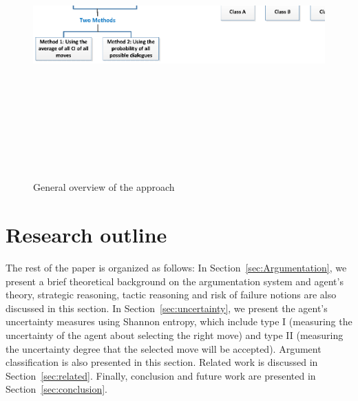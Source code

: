 \begin{figure}[t]
                \begin{center}
                \includegraphics[width=15cm, height=11cm]{Figures/Approach1.eps}
                \end{center}
                \caption{General overview of the approach}\label{fig1.0}
                \label{Stack}
                \end{figure}


\section{Research outline}\label{sec:outline}
The rest of the paper is organized as follows: In Section~\ref{sec:Argumentation}, we present a  brief theoretical background on the argumentation system
and agent's theory, strategic reasoning, tactic reasoning and risk of failure notions are also discussed in this section. In Section~\ref{sec:uncertainty},
we present the agent's uncertainty measures using Shannon entropy, which include type I (measuring the uncertainty of the agent about selecting the right move)
and type II (measuring the uncertainty degree that the selected move will be accepted). Argument classification is also presented in this section. Related work
is discussed in Section~\ref{sec:related}. Finally, conclusion and future work are presented in Section~\ref{sec:conclusion}.






